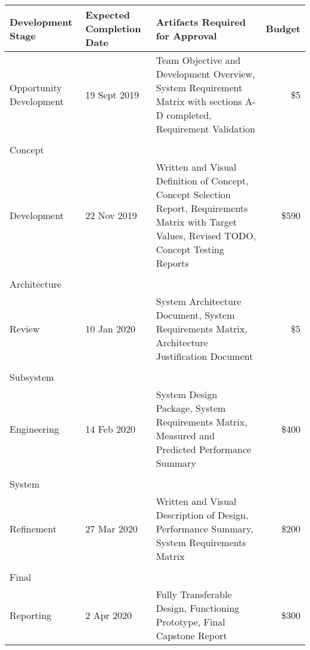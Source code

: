 
    \begin{center}
    \label{tab:Approval_Matrix}
    \begin{tabular}{ >{\raggedright}p{2.4cm} p{2.3cm} >{\raggedright}p{6.5cm} r}

    \hline
    \textbf{Development Stage}& \textbf{Expected Completion Date} & \textbf{Artifacts Required for Approval} & \textbf{Budget} \\

    \hline
    \hline
    Opportunity Development & 19 Sept 2019 & Team Objective and Development Overview, System Requirement Matrix with sections A-D completed, Requirement Validation & \$5\\
    &&&\\
    Concept\\ Development & 22 Nov 2019 & Written and Visual Definition of Concept, Concept Selection Report, Requirements Matrix with Target Values, Revised TODO, Concept Testing Reports & \$590\\
    &&&\\
     Architecture\\ Review & 10 Jan 2020 & System Architecture Document, System Requirements Matrix, Architecture Justification Document & \$5\\
    &&&\\
    Subsystem\\ Engineering & 14 Feb 2020 & System Design Package, System Requirements Matrix, Measured and Predicted Performance Summary & \$400\\
    &&&\\
    System\\ Refinement & 27 Mar 2020 & Written and Visual Description of Design, Performance Summary, System Requirements Matrix & \$200\\
    &&&\\
    Final\\ Reporting & 2 Apr 2020 & Fully Transferable Design, Functioning Prototype, Final Capstone Report & \$300\\
    \hline
    \end{tabular}
    \end{center}
